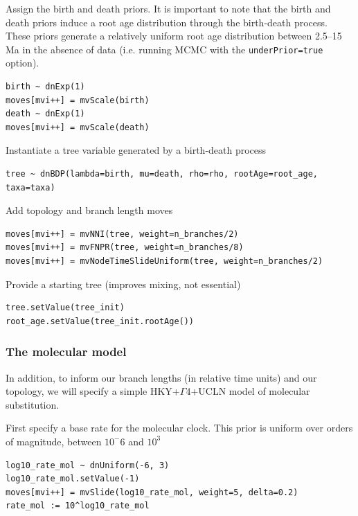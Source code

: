 Assign the birth and death priors.
It is important to note that the birth and death priors induce a root age distribution through the birth-death process.
These priors generate a relatively uniform root age distribution between 2.5--15 Ma in the absence of data (i.e. running MCMC with the {\tt underPrior=true} option).
\begin{snugshade}
\begin{lstlisting}
birth ~ dnExp(1)
moves[mvi++] = mvScale(birth)
death ~ dnExp(1)
moves[mvi++] = mvScale(death)
\end{lstlisting}
\end{snugshade}

Instantiate a tree variable generated by a birth-death process
\begin{snugshade}
\begin{lstlisting}
tree ~ dnBDP(lambda=birth, mu=death, rho=rho, rootAge=root_age, taxa=taxa)
\end{lstlisting}
\end{snugshade}


Add topology and branch length moves
\begin{snugshade}
\begin{lstlisting}
moves[mvi++] = mvNNI(tree, weight=n_branches/2)
moves[mvi++] = mvFNPR(tree, weight=n_branches/8)
moves[mvi++] = mvNodeTimeSlideUniform(tree, weight=n_branches/2)
\end{lstlisting}
\end{snugshade}

Provide a starting tree (improves mixing, not essential)

\begin{snugshade}
\begin{lstlisting}
tree.setValue(tree_init)
root_age.setValue(tree_init.rootAge())
\end{lstlisting}
\end{snugshade}


\subsubsection{The molecular model}

In addition, to inform our branch lengths (in relative time units) and our topology, we will specify a simple HKY+$\Gamma4$+UCLN model of molecular substitution.


First specify a base rate for the molecular clock. This prior is uniform over orders of magnitude, between $10^-6$ and $10^3$
\begin{snugshade}
\begin{lstlisting}
log10_rate_mol ~ dnUniform(-6, 3)
log10_rate_mol.setValue(-1)
moves[mvi++] = mvSlide(log10_rate_mol, weight=5, delta=0.2)
rate_mol := 10^log10_rate_mol
\end{lstlisting}
\end{snugshade}

